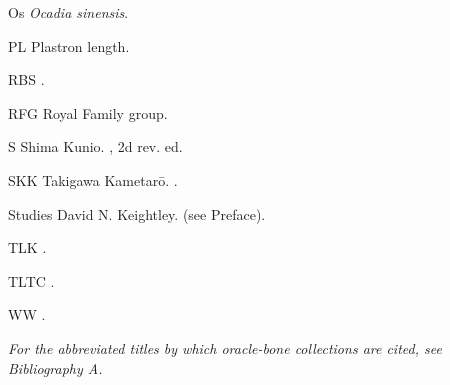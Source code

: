 \begin{list}{}
  \item[Os] \textit{Ocadia sinensis}.
  \item[PL] Plastron length.
  \item[RBS] .
  \item[RFG] Royal Family group.
  \item[S] Shima Kunio. , 2d rev. ed.
  \item[SKK] Takigawa Kametarō. .
  \item[Studies] David N. Keightley.  (see Preface).
  \item[TLK] .
  \item[TLTC] .
  \item[WW] .
\end{list}

\emph{For the abbreviated titles by which oracle-bone collections are cited, see Bibliography A.}
